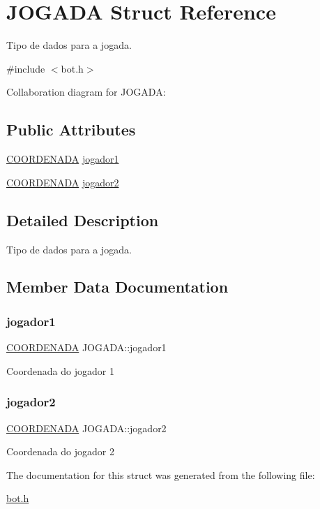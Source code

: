 \hypertarget{structJOGADA}{}\section{J\+O\+G\+A\+DA Struct Reference}
\label{structJOGADA}


Tipo de dados para a jogada.  




{\ttfamily \#include $<$bot.\+h$>$}



Collaboration diagram for J\+O\+G\+A\+DA\+:
\subsection*{Public Attributes}
\begin{DoxyCompactItemize}
\item 
\hyperlink{structCOORDENADA}{C\+O\+O\+R\+D\+E\+N\+A\+DA} \hyperlink{structJOGADA_a93d9306cb0c49b66b7d9a615bffe0149}{jogador1}
\item 
\hyperlink{structCOORDENADA}{C\+O\+O\+R\+D\+E\+N\+A\+DA} \hyperlink{structJOGADA_ab46b16dfbdc7f2af9430c8dcdac0914b}{jogador2}
\end{DoxyCompactItemize}


\subsection{Detailed Description}
Tipo de dados para a jogada. 

\subsection{Member Data Documentation}
\mbox{\label{structJOGADA_a93d9306cb0c49b66b7d9a615bffe0149}} 
\subsubsection{\texorpdfstring{jogador1}{jogador1}}
{\footnotesize\ttfamily \hyperlink{structCOORDENADA}{C\+O\+O\+R\+D\+E\+N\+A\+DA} J\+O\+G\+A\+D\+A\+::jogador1}

Coordenada do jogador 1 \mbox{\label{structJOGADA_ab46b16dfbdc7f2af9430c8dcdac0914b}} 
\subsubsection{\texorpdfstring{jogador2}{jogador2}}
{\footnotesize\ttfamily \hyperlink{structCOORDENADA}{C\+O\+O\+R\+D\+E\+N\+A\+DA} J\+O\+G\+A\+D\+A\+::jogador2}

Coordenada do jogador 2 

The documentation for this struct was generated from the following file\+:\begin{DoxyCompactItemize}
\item 
\hyperlink{bot_8h}{bot.\+h}\end{DoxyCompactItemize}
